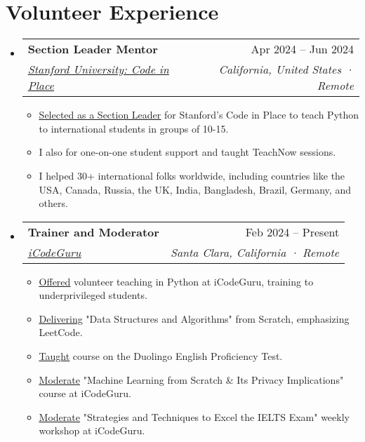 \documentclass[letterpaper,11pt]{article}
\makeatletter
\newcommand{\resumeItem}[1]{
  \item\small{
    {#1 \vspace{-2pt}}
  }
}
\newcommand{\resumeSubheading}[4]{
  \vspace{-2pt}\item
    \begin{tabular*}{0.97\textwidth}[t]{l@{\extracolsep{\fill}}r}
      \textbf{#1} & #2 \\
      \textit{\small#3} & \textit{\small #4} \\
    \end{tabular*}\vspace{-7pt}
}
\newcommand{\resumeSubHeadingListStart}{\begin{itemize}[leftmargin=0.15in, label={}]}
\newcommand{\resumeSubHeadingListEnd}{\end{itemize}}
\newcommand{\resumeItemListStart}{\begin{itemize}}
\newcommand{\resumeItemListEnd}{\end{itemize}\vspace{-5pt}}
\makeatother
\begin{document}
\section{\textbf{Volunteer Experience}}
\resumeSubHeadingListStart
\resumeSubheading
{Section Leader Mentor}{Apr 2024 -- Jun 2024}
{{\href{https://codeinplace.stanford.edu/}{\underline{Stanford University: Code in Place}}}}{California, United States · Remote}
\resumeItemListStart
\resumeItem{{\href{https://www.linkedin.com/feed/update/urn:li:activity:7223990886295064576/}{\underline{Selected as a Section Leader}}} for Stanford's Code in Place to teach Python to international students in groups of 10-15.}
\resumeItem{I also for one-on-one student support and taught TeachNow sessions.}
\resumeItem{ I helped 30+ international folks worldwide, including countries like the USA, Canada, Russia, the UK, India, Bangladesh, Brazil, Germany, and others.}
\resumeItemListEnd
\resumeSubheading
{Trainer and Moderator}{Feb 2024 -- Present}
{{\href{https://www.linkedin.com/company/icode-guru/mycompany/}{\underline{iCodeGuru}}}}{Santa Clara, California · Remote}
\resumeItemListStart
\resumeItem{{\href{https://github.com/sikander-nawaz/Python_Volunteer_Teaching}{\underline{Offered}}} volunteer teaching in Python at iCodeGuru, training to underprivileged students.}
\resumeItem{{\href{https://github.com/sikander-nawaz/DSA_Volunteer_Teaching}{\underline{Delivering}}} "Data Structures and Algorithms" from Scratch, emphasizing LeetCode.}
\resumeItem{{\href{https://www.youtube.com/watch?v=b366KTKppyU&list=PLe-jr3hh4N_mE6iQg-GiaCpu4cBEn6LVq&index=1}{\underline{Taught}}} course on the Duolingo English Proficiency Test.}
\resumeItem{{\href{https://github.com/Ahmadjajja/Machine-Learning_and_its-privacy-implications}{\underline{Moderate}}} "Machine Learning from Scratch \& Its Privacy Implications" course at iCodeGuru.}
\resumeItem{{\href{https://www.linkedin.com/posts/sikander-nawaz_announcement-icodeguru-is-excited-activity-7212688604307857408-Scw9?utm_source=share&utm_medium=member_desktop}{\underline{Moderate}}} "Strategies and Techniques to Excel the IELTS Exam" weekly workshop at iCodeGuru.}
\resumeItemListEnd
\resumeSubHeadingListEnd
%
\end{document}
